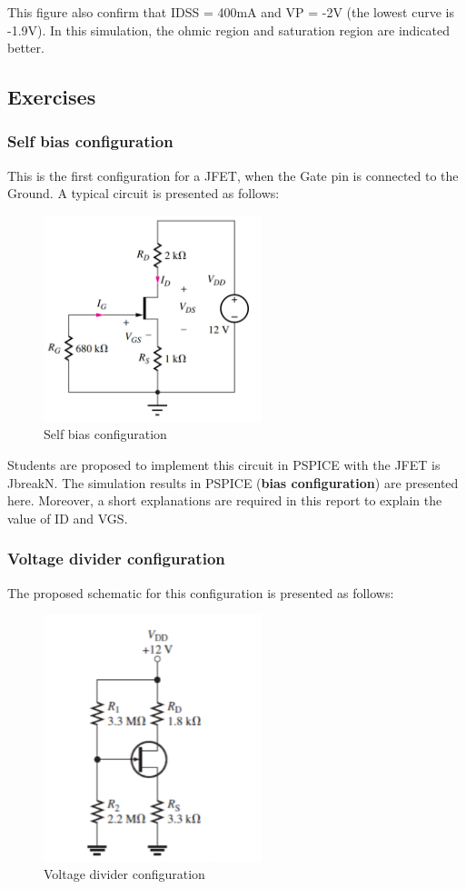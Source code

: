 This figure also confirm that IDSS = 400mA and VP = -2V (the lowest curve is -1.9V). In this simulation, the ohmic region and saturation region are indicated better.

\subsection{Exercises}
\subsubsection{Self bias configuration}
This is the first configuration for a JFET, when the Gate pin is connected to the Ground. A typical circuit is presented as follows:

\begin{figure}[!htp]
    \centering
    \includegraphics[width = 2.5in]{source/picture/bai_6/jfet7.PNG}
    \caption{Self bias configuration}
    \label{jfet_7}
\end{figure}

Students are proposed to implement this circuit in PSPICE with the JFET is JbreakN. The simulation results in PSPICE (\textbf{bias configuration}) are presented here. Moreover, a short explanations are required in this report to explain the value of ID and VGS.

\subsubsection{Voltage divider configuration}
The proposed schematic for this configuration is presented as follows:
\begin{figure}[!htp]
    \centering
    \includegraphics[width = 2.5in]{source/picture/bai_6/jfet8.PNG}
    \caption{Voltage divider configuration}
    \label{jfet_8}
\end{figure}

